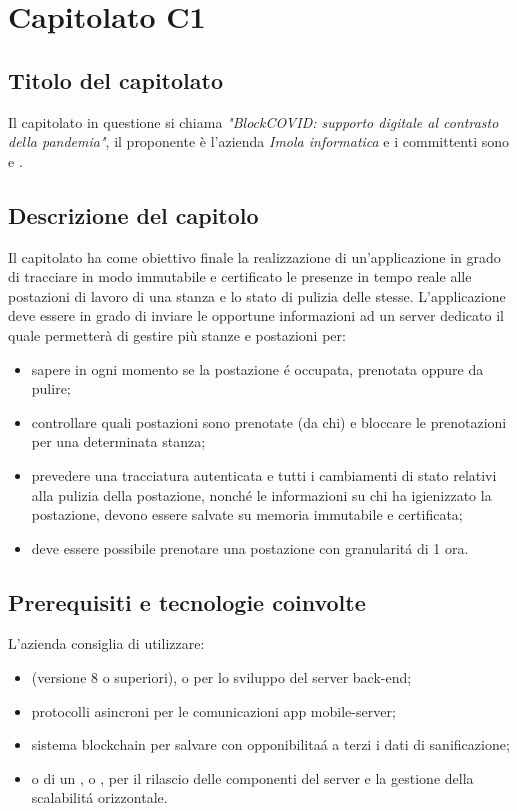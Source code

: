 \section{Capitolato C1}
\subsection{Titolo del capitolato}
Il capitolato in questione si chiama \textit{"BlockCOVID: supporto digitale al contrasto della pandemia"}, il proponente \`e l'azienda \textit{Imola informatica} e i committenti sono \VT{} e \CR{}.

\subsection{Descrizione del capitolo}
Il capitolato ha come obiettivo finale la realizzazione di un'applicazione in grado di tracciare in modo immutabile e certificato le presenze in tempo reale alle postazioni di lavoro di una stanza e lo stato di pulizia delle stesse. 
L'applicazione deve essere in grado di inviare le opportune informazioni ad un server dedicato il quale permetterà di gestire più stanze e postazioni per:
\begin{itemize}
\item sapere in ogni momento se la postazione \'e occupata, prenotata oppure da pulire;
\item controllare quali postazioni sono prenotate (da chi) e bloccare le prenotazioni per una determinata stanza;
\item prevedere una tracciatura autenticata e tutti i cambiamenti di stato relativi alla pulizia della postazione, nonch\'e le informazioni su chi ha igienizzato la postazione, devono essere salvate su memoria immutabile e certificata;
\item deve essere possibile prenotare una postazione con granularit\'a di 1 ora.
\end{itemize}

\subsection{Prerequisiti e tecnologie coinvolte}
L'azienda consiglia di utilizzare:

\begin{itemize}
\item {} (versione 8 o superiori),  o  per lo sviluppo del server back-end;
\item protocolli asincroni per le comunicazioni app mobile-server;
\item sistema blockchain per salvare con opponibilita\'a a terzi i dati di sanificazione;
\item {} o di un ,  o , per il rilascio delle componenti del server e la gestione della scalabilit\'a orizzontale.
\end{itemize}

